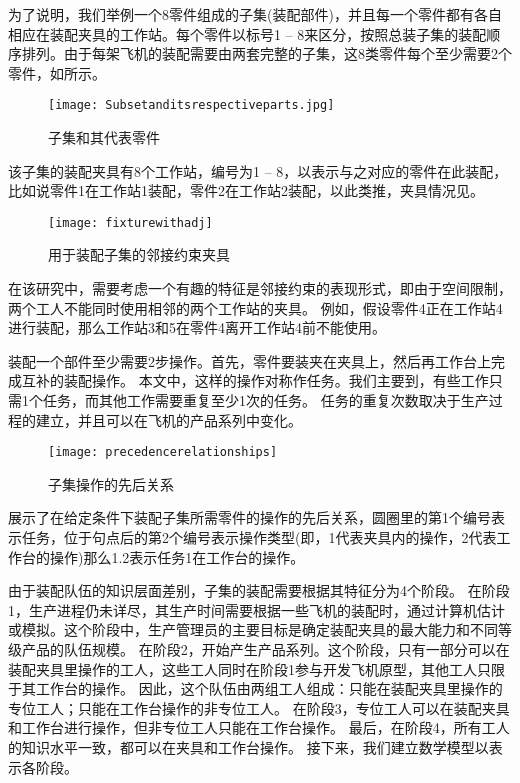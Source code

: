 为了说明，我们举例一个8零件组成的子集(装配部件)，并且每一个零件都有各自相应在装配夹具的工作站。每个零件以标号1 -- 8来区分，按照总装子集的装配顺序排列。由于每架飞机的装配需要由两套完整的子集，这8类零件每个至少需要2个零件，如所示。
\begin{figure}[h]
\centering\caption{子集和其代表零件\label{fig:subsetandparts}}
\texttt{[image: Subsetanditsrespectiveparts.jpg]}
\end{figure}

该子集的装配夹具有8个工作站，编号为1 -- 8，以表示与之对应的零件在此装配，比如说零件1在工作站1装配，零件2在工作站2装配，以此类推，夹具情况见。
\begin{figure}[h]
\centering
\texttt{[image: fixturewithadj]}
\caption{用于装配子集的邻接约束夹具\label{fig:fixturewithadj}}
\end{figure}
在该研究中，需要考虑一个有趣的特征是邻接约束的表现形式，即由于空间限制，两个工人不能同时使用相邻的两个工作站的夹具。
例如，假设零件4正在工作站4进行装配，那么工作站3和5在零件4离开工作站4前不能使用。

装配一个部件至少需要2步操作。首先，零件要装夹在夹具上，然后再工作台上完成互补的装配操作。
本文中，这样的操作对称作任务。我们主要到，有些工作只需1个任务，而其他工作需要重复至少1次的任务。
任务的重复次数取决于生产过程的建立，并且可以在飞机的产品系列中变化。
\begin{figure}[h]
\centering
\texttt{[image: precedencerelationships]}
\caption{子集操作的先后关系\label{fig:subsetoperation}}
\end{figure}
展示了在给定条件下装配子集所需零件的操作的先后关系，圆圈里的第1个编号表示任务，位于句点后的第2个编号表示操作类型(即，1代表夹具内的操作，2代表工作台的操作)那么1.2表示任务1在工作台的操作。

由于装配队伍的知识层面差别，子集的装配需要根据其特征分为4个阶段。
在阶段1，生产进程仍未详尽，其生产时间需要根据一些飞机的装配时，通过计算机估计或模拟。这个阶段中，生产管理员的主要目标是确定装配夹具的最大能力和不同等级产品的队伍规模。
在阶段2，开始产生产品系列。这个阶段，只有一部分可以在装配夹具里操作的工人，这些工人同时在阶段1参与开发飞机原型，其他工人只限于其工作台的操作。
因此，这个队伍由两组工人组成：只能在装配夹具里操作的专位工人；只能在工作台操作的非专位工人。
在阶段3，专位工人可以在装配夹具和工作台进行操作，但非专位工人只能在工作台操作。
最后，在阶段4，所有工人的知识水平一致，都可以在夹具和工作台操作。
接下来，我们建立数学模型以表示各阶段。